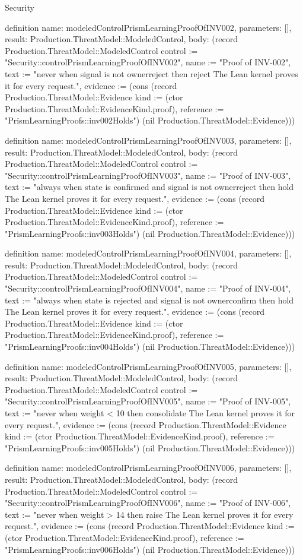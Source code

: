 \begin{lexlean}{Security}
\begin{semanticmodule}
definition{
  name: modeledControlPrismLearningProofOfINV002,
  parameters: [],
  result: Production.ThreatModel::ModeledControl,
  body: (record Production.ThreatModel::ModeledControl {control := "Security::controlPrismLearningProofOfINV002", name := "Proof of INV-002", text := "never when signal is not ownerreject then reject The Lean kernel proves it for every request.", evidence := (cons (record Production.ThreatModel::Evidence {kind := (ctor Production.ThreatModel::EvidenceKind.proof), reference := "PrismLearningProofs::inv002Holds"}) (nil Production.ThreatModel::Evidence))})
}

definition{
  name: modeledControlPrismLearningProofOfINV003,
  parameters: [],
  result: Production.ThreatModel::ModeledControl,
  body: (record Production.ThreatModel::ModeledControl {control := "Security::controlPrismLearningProofOfINV003", name := "Proof of INV-003", text := "always when state is confirmed and signal is not ownerreject then hold The Lean kernel proves it for every request.", evidence := (cons (record Production.ThreatModel::Evidence {kind := (ctor Production.ThreatModel::EvidenceKind.proof), reference := "PrismLearningProofs::inv003Holds"}) (nil Production.ThreatModel::Evidence))})
}

definition{
  name: modeledControlPrismLearningProofOfINV004,
  parameters: [],
  result: Production.ThreatModel::ModeledControl,
  body: (record Production.ThreatModel::ModeledControl {control := "Security::controlPrismLearningProofOfINV004", name := "Proof of INV-004", text := "always when state is rejected and signal is not ownerconfirm then hold The Lean kernel proves it for every request.", evidence := (cons (record Production.ThreatModel::Evidence {kind := (ctor Production.ThreatModel::EvidenceKind.proof), reference := "PrismLearningProofs::inv004Holds"}) (nil Production.ThreatModel::Evidence))})
}

definition{
  name: modeledControlPrismLearningProofOfINV005,
  parameters: [],
  result: Production.ThreatModel::ModeledControl,
  body: (record Production.ThreatModel::ModeledControl {control := "Security::controlPrismLearningProofOfINV005", name := "Proof of INV-005", text := "never when weight < 10 then consolidate The Lean kernel proves it for every request.", evidence := (cons (record Production.ThreatModel::Evidence {kind := (ctor Production.ThreatModel::EvidenceKind.proof), reference := "PrismLearningProofs::inv005Holds"}) (nil Production.ThreatModel::Evidence))})
}

definition{
  name: modeledControlPrismLearningProofOfINV006,
  parameters: [],
  result: Production.ThreatModel::ModeledControl,
  body: (record Production.ThreatModel::ModeledControl {control := "Security::controlPrismLearningProofOfINV006", name := "Proof of INV-006", text := "never when weight > 14 then raise The Lean kernel proves it for every request.", evidence := (cons (record Production.ThreatModel::Evidence {kind := (ctor Production.ThreatModel::EvidenceKind.proof), reference := "PrismLearningProofs::inv006Holds"}) (nil Production.ThreatModel::Evidence))})
}


\end{semanticmodule}
\end{lexlean}
